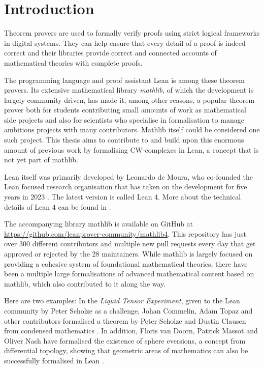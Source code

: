 \chapter*{Introduction}


Theorem provers are used to formally verify proofs using strict logical frameworks in digital systems. 
They can help ensure that every detail of a proof is indeed correct and their libraries provide correct and connected accounts of mathematical theories with complete proofs.

The programming language and proof assistant Lean is among these theorem provers.
Its extensive mathematical library \emph{mathlib}, of which the development is largely community driven, has made it, among other reasons, a popular theorem prover both for students contributing small amounts of work as mathematical side projects and also for scientists who specialise in formalisation to manage ambitious projects with many contributors. 
Mathlib itself could be considered one such project. 
This thesis aims to contribute to and build upon this enormous amount of previous work by formalising CW-complexes in Lean, a concept that is not yet part of mathlib.

Lean itself was primarily developed by Leonardo de Moura, who co-founded the Lean focused research organisation that has taken on the development for five years in 2023 \cite{LeanFRO2024}. 
The latest version is called Lean 4.
More about the technical details of Lean 4 can be found in \cite{deMoura2021}.

The accompanying library mathlib is available on GitHub at \url{https://github.com/leanprover-community/mathlib4}. 
This repository has just over 300 different contributors and multiple new pull requests every day that get approved or rejected by the 28 maintainers.
While mathlib is largely focused on providing a cohesive system of foundational mathematical theories, there have been a multiple large formalisations of advanced mathematical content based on mathlib, which also contributed to it along the way. 

Here are two examples: 
In the \emph{Liquid Tensor Experiment}, given to the Lean community by Peter Scholze as a challenge, Johan Commelin, Adam Topaz and other contributors formalised a theorem by Peter Scholze and Dustin Clausen from condensed mathematics \cite{Commelin2022}.
In addition, Floris van Doorn, Patrick Massot and Oliver Nash have formalised the existence of sphere eversions, a concept from differential topology, showing that geometric areas of mathematics can also be successfully formalised in Lean \cite{vanDoorn2023}. 

